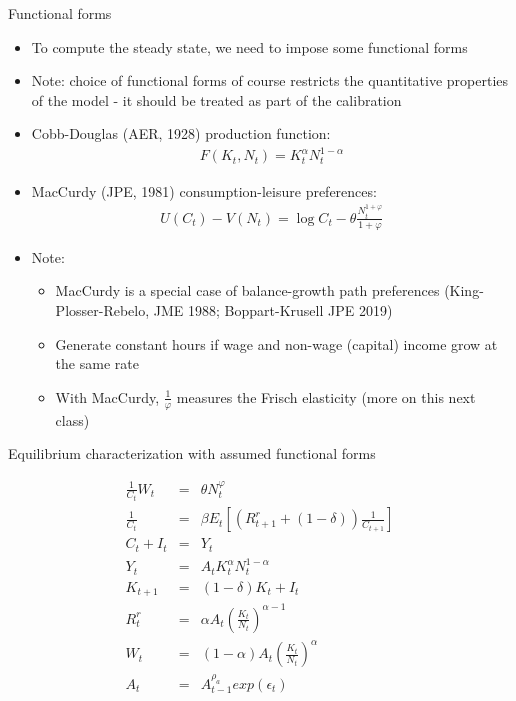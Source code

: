 \documentclass[9pt,xcolor={dvipsnames}]{beamer}
\newcommand{\bit}{\begin{itemize}}
\newcommand{\eit}{\end{itemize}}
\newcommand{\bc}{\color{blue}}
\begin{document}
\begin{frame}{Functional forms}

\bit
\setlength\itemsep{1.5em}

\item To compute the steady state, we need to impose some functional forms

\item Note: choice of functional forms of course restricts the quantitative properties of the model - it should be treated as part of the {\bc calibration}

\item Cobb-Douglas (AER, 1928) production function:
\begin{eqnarray}
F (K_t, N_t) = K_t^{\alpha}N_t^{1-\alpha} \nonumber
\end{eqnarray}

\item MacCurdy (JPE, 1981) consumption-leisure preferences:
\begin{eqnarray}
U(C_t)-V(N_t) = \log C_t - \theta \frac{N_t^{1+\varphi}}{1+\varphi} \nonumber
\end{eqnarray}

\item Note: 
\bit
	\setlength\itemsep{0.5em}
	\item MacCurdy is a special case of balance-growth path preferences (King-Plosser-Rebelo, JME 1988; Boppart-Krusell JPE 2019)
	
	\item Generate constant hours if wage and non-wage (capital) income grow at the same rate
	
	\item With MacCurdy, $\frac{1}{\varphi}$ measures the {\bc Frisch elasticity} (more on this next class)
\eit
\eit

\end{frame}

\begin{frame}{Equilibrium characterization with assumed functional forms}


\begin{eqnarray}
\frac{1}{C_t}W_t &=& \theta N_t^{\varphi} \nonumber \\
\frac{1}{C_t} &=& \beta E_t\left[(R^{r}_{t+1}+(1-\delta)) \frac{1}{C_{t+1}} \right] \nonumber \\
C_t + I_t &=& Y_t \nonumber \\
Y_t &=& A_t K_t^{\alpha}N_t^{1-\alpha} \nonumber \\
K_{t+1} &=& (1-\delta) K_t + I_t \nonumber \\
R^{r}_t &=& \alpha A_t \left(\frac{K_t}{N_t}\right)^{\alpha-1} \nonumber \\
W_t &=& (1-\alpha) A_t \left(\frac{K_t}{N_t}\right)^{\alpha} \nonumber \\
A_t &=& A_{t-1}^{\rho_a}exp(\epsilon_t) \nonumber
\end{eqnarray}


\end{frame}
\end{document}

